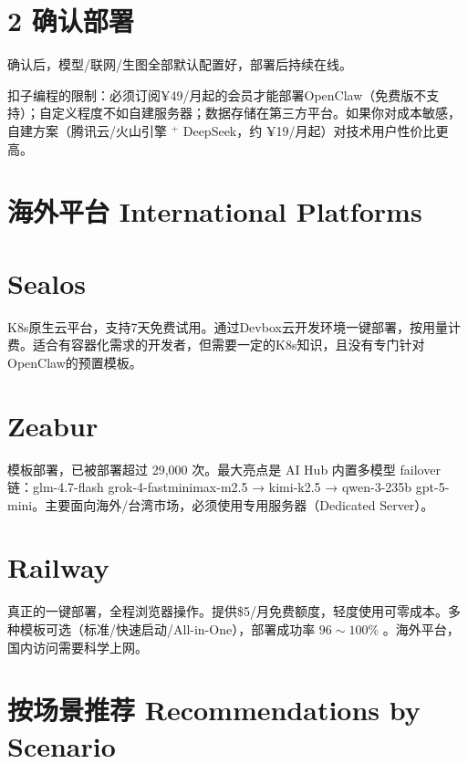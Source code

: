 \documentclass[
  10
]{article}
\begin{document}
\section{2 确认部署}\label{ux786eux8ba4ux90e8ux7f72}

确认后，模型/联网/生图全部默认配置好，部署后持续在线。

扣子编程的限制：必须订阅¥49/月起的会员才能部署OpenClaw（免费版不支持）；自定义程度不如自建服务器；数据存储在第三方平台。如果你对成本敏感，自建方案（腾讯云/火山引擎
\(^ +\) DeepSeek，约 ¥19/月起）对技术用户性价比更高。

\section{海外平台 International
Platforms}\label{ux6d77ux5916ux5e73ux53f0-international-platforms}

\section{Sealos}\label{sealos}

K8s原生云平台，支持7天免费试用。通过Devbox云开发环境一键部署，按用量计费。适合有容器化需求的开发者，但需要一定的K8s知识，且没有专门针对OpenClaw的预置模板。

\section{Zeabur}\label{zeabur}

模板部署，已被部署超过 29,000 次。最大亮点是 AI Hub 内置多模型 failover
链：glm-4.7-flash grok-4-fastminimax-m2.5 → kimi-k2.5 → qwen-3-235b
gpt-5-mini。主要面向海外/台湾市场，必须使用专用服务器（Dedicated
Server）。

\section{Railway}\label{railway}

真正的一键部署，全程浏览器操作。提供\$5/月免费额度，轻度使用可零成本。多种模板可选（标准/快速启动/All-in-One），部署成功率
\(9 6 { \sim } 1 0 0 \%\) 。海外平台，国内访问需要科学上网。

\section{按场景推荐 Recommendations by
Scenario}\label{ux6309ux573aux666fux63a8ux8350-recommendations-by-scenario}
\end{document}
